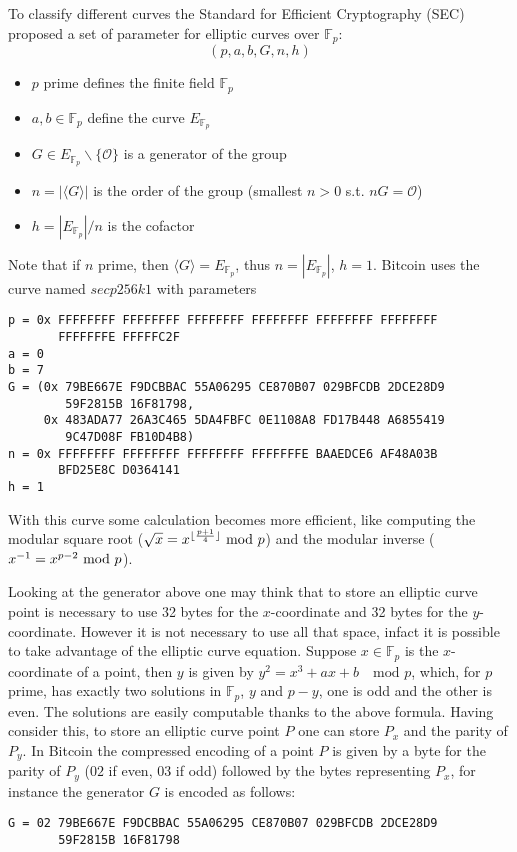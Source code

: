 To classify different curves the Standard for Efficient Cryptography (SEC) proposed a set of parameter for elliptic curves over $\mathbb{F}_p$:
\begin{equation}
(p, a, b, G, n, h)
\end{equation}
\begin{itemize}
	\item $p$ prime defines the finite field $\mathbb{F}_p$
	\item $a, b \in \mathbb{F}_p$ define the curve $E_{\mathbb{F}_p}$
	\item $G\in E_{\mathbb{F}_p}\backslash \{\mathcal{O}\}$ is a generator of the group
	\item $n = |\langle G \rangle|$ is the order of the group (smallest $n>0$ s.t. $nG = \mathcal{O}$)
	\item $h = |E_{\mathbb{F}_p}| / n$ is the cofactor
\end{itemize}
Note that if $n$ prime, then $\langle G \rangle = E_{\mathbb{F}_p}$, thus $n = |E_{\mathbb{F}_p}|$, $h=1$.
Bitcoin uses the curve named $secp256k1$ with parameters
\begin{verbatim}
p = 0x FFFFFFFF FFFFFFFF FFFFFFFF FFFFFFFF FFFFFFFF FFFFFFFF 
       FFFFFFFE FFFFFC2F
a = 0
b = 7
G = (0x 79BE667E F9DCBBAC 55A06295 CE870B07 029BFCDB 2DCE28D9 
        59F2815B 16F81798, 
     0x 483ADA77 26A3C465 5DA4FBFC 0E1108A8 FD17B448 A6855419 
        9C47D08F FB10D4B8)
n = 0x FFFFFFFF FFFFFFFF FFFFFFFF FFFFFFFE BAAEDCE6 AF48A03B 
       BFD25E8C D0364141
h = 1
\end{verbatim}
With this curve some calculation becomes more efficient, like computing the modular square root ($\sqrt{x}=x^{\lfloor\frac{p+1}{4}\rfloor}\textmd{ mod }p$) and the modular inverse ($x^{-1}=x^{p-2}\textmd{ mod }p$).

Looking at the generator above one may think that to store an elliptic curve point is necessary to use 32 bytes for the $x$-coordinate and 32 bytes for the $y$-coordinate. 
However it is not necessary to use all that space, infact it is possible to take advantage of the elliptic curve equation. Suppose $x \in \mathbb{F}_p$ is the $x$-coordinate of a point, then $y$ is given by $y^2 = x^3 + ax + b \quad \text{mod }p$, which, for $p$ prime, has exactly two solutions in $\mathbb{F}_p$, $y$ and $p-y$, one is odd and the other is even.
The solutions are easily computable thanks to the above formula.
Having consider this, to store an elliptic curve point $P$ one can store $P_x$ and the parity of $P_y$. 
In Bitcoin the compressed encoding of a point $P$ is given by a byte for the parity of $P_y$ ($02$ if even, $03$ if odd) followed by the bytes representing $P_x$, for instance the generator $G$ is encoded as follows:
\begin{verbatim}
G = 02 79BE667E F9DCBBAC 55A06295 CE870B07 029BFCDB 2DCE28D9 
       59F2815B 16F81798
\end{verbatim}

